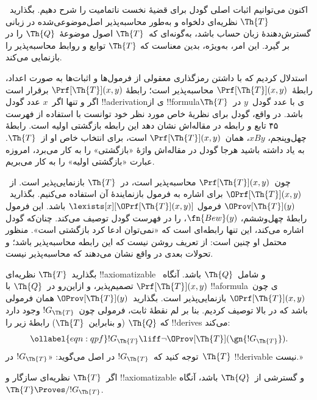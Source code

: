 \documentclass[../../../include/open-logic-section]{subfiles}
\begin{document}


اکنون می‌توانیم اثبات اصلی گودل برای قضیهٔ نخست ناتمامیت را شرح دهیم.
بگذارید~$\Th{T}$ نظریه‌ای دلخواه و به‌طور محاسبه‌پذیر اصل‌موضوعی‌شده
در زبانی گسترش‌دهندهٔ زبان حساب باشد، به‌گونه‌ای که~$\Th{T}$ اصول
موضوعهٔ~$\Th{Q}$ را در بر گیرد. این امر، به‌ویژه، بدین معناست که
$\Th{T}$ توابع و روابط محاسبه‌پذیر را بازنمایی می‌کند.

استدلال کردیم که با داشتن رمزگذاری معقولی از فرمول‌ها و اثبات‌ها به
صورت اعداد، رابطهٔ~$\Prf[\Th{T}](x,y)$ محاسبه‌پذیر است؛ رابطهٔ
$\Prf[\Th{T}](x,y)$ برقرار است اگر و تنها اگر~$x$ عدد گودل
!!a{derivation}ی از
!!{formula}ی با عدد گودل~$y$ در~$\Th{T}$ باشد. در واقع، گودل برای
نظریهٔ خاص مورد نظر خود توانست با استفاده از فهرست ۴۵ تابع و رابطه در
مقاله‌اش نشان دهد این رابطه بازگشتی اولیه است. رابطهٔ چهل‌وپنجم،
$x B y$، همان~$\Prf[\Th{T}](x,y)$ است، برای انتخاب خاص او از~$\Th{T}$.
به یاد داشته باشید هرجا گودل در مقاله‌اش واژهٔ «بازگشتی» را به
کار می‌برد، امروزه عبارت «بازگشتی اولیه» را به کار می‌بریم.

چون~$\Prf[\Th{T}](x,y)$ محاسبه‌پذیر است، در~$\Th{T}$ بازنمایی‌پذیر
است. از~$\OPrf[\Th{T}](x,y)$ برای اشاره به فرمول بازنمایندهٔ آن استفاده
می‌کنیم. بگذارید~$\OProv[\Th{T}](y)$ فرمول
$\lexists[x][\OPrf[\Th{T}](x,y)]$ باشد. این فرمول رابطهٔ چهل‌وششم،
$\fn{Bew}(y)$، را در فهرست گودل توصیف می‌کند. چنان‌که گودل اشاره
می‌کند، این تنها رابطه‌ای است که «نمی‌توان ادعا کرد بازگشتی است». منظور
محتمل او چنین است: از تعریف روشن نیست که این رابطه محاسبه‌پذیر باشد؛
و تحولات بعدی در واقع نشان می‌دهند که محاسبه‌پذیر نیست.

بگذارید~$\Th{T}$ نظریه‌ای !!{axiomatizable} و شامل~$\Th{Q}$ باشد.
آنگاه~$\Prf[\Th{T}](x, y)$ تصمیم‌پذیر، و ازاین‌رو در~$\Th{Q}$ با
!!a{formula}ی چون~$\OPrf[\Th{T}](x, y)$ بازنمایی‌پذیر
است. بگذارید~$\OProv[\Th{T}](y)$ همان فرمولی باشد که در بالا توصیف
کردیم. بنا بر لم نقطهٔ ثابت، فرمولی چون~$!G_\Th{T}$ وجود دارد که
$\Th{Q}$ (و بنابراین~$\Th{T}$) رابطهٔ زیر را !!{derive}s می‌کند:
\begin{equation}
\ollabel{eqn:qpf}
!G_\Th{T} \liff \lnot \OProv[\Th{T}](\gn{!G_\Th{T}}).
\end{equation}
توجه کنید که~$!G_\Th{T}$ در اصل می‌گوید: «$!G_\Th{T}$ در~$\Th{T}$
!!{derivable} نیست.»

\begin{lem}
اگر~$\Th{T}$ نظریه‌ای سازگار و !!{axiomatizable} و گسترشی از~$\Th{Q}$
باشد، آنگاه~$\Th{T} \Proves/ !G_\Th{T}$.
\end{lem}
\end{document}
